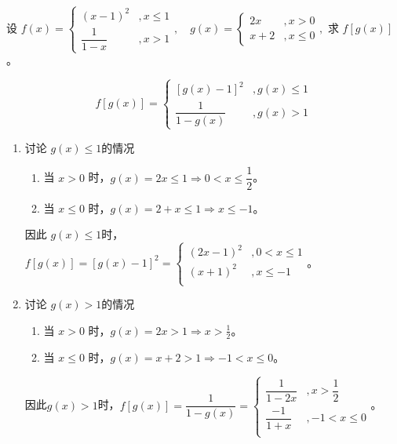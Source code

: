 \begin{Problem}
    设
    \(
    f(x)=\begin{cases}
    (x-1)^2 & ,x\le 1 \\
    \dfrac{1}{1-x} & ,x>1
    \end{cases},
    \quad
    g(x)=\begin{cases}
    2x & ,x>0 \\
    x+2 & ,x\le 0
    \end{cases},
    \)
    求 $f[g(x)]$。
\end{Problem}
\begin{Answer}
    \[
    f[g(x)]=
    \begin{cases}
    [g(x)-1]^2&, g(x)\le 1 \\
    \dfrac{1}{1-g(x)}&, g(x)>1
    \end{cases}
    \]
    \begin{enumerate}[label=(\arabic*)]
    \item 讨论 \(g(x)\le 1\)的情况
        \begin{enumerate}[label=(\alph*)]
            \item 当 \(x > 0\) 时，\(g(x)=2x\le 1 \Rightarrow 0 < x \le \dfrac{1}{2}\)。
            \item 当 \(x \le 0\) 时，\(g(x)=2+x\le 1 \Rightarrow x\le -1\)。
        \end{enumerate}
        因此 \(g(x)\le 1\)时，$f[g(x)]=[g(x)-1]^2=\begin{cases}
            (2x-1)^2&,0 < x\le 1\\
            (x+1)^2&,x \le -1\\
        \end{cases} $。
    \item 讨论 \(g(x)> 1\)的情况
        \begin{enumerate}[label=(\alph*)]
            \item 当 \(x > 0\) 时，\(g(x)=2x> 1 \Rightarrow x>\frac{1}{2}\)。
            \item 当 \(x \le 0\) 时，\(g(x)=x+2> 1 \Rightarrow -1 < x \le 0\)。   
        \end{enumerate}
        因此\(g(x)> 1\)时，$f[g(x)]=\dfrac{1}{1-g(x)}=
        \begin{cases}
            \dfrac{1}{1-2x}&,x >\dfrac{1}{2}\\
            \dfrac{-1}{1+x}&,-1 < x \le 0\\
        \end{cases}$。

\end{enumerate}
\end{Answer}
